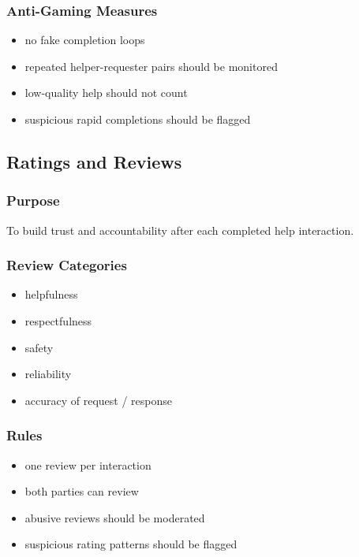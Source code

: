 \documentclass[11pt]{article}
\begin{document}
\subsubsection{Anti-Gaming Measures}
\begin{itemize}[leftmargin=1.5em]
    \item no fake completion loops
    \item repeated helper-requester pairs should be monitored
    \item low-quality help should not count
    \item suspicious rapid completions should be flagged
\end{itemize}

\subsection{Ratings and Reviews}

\subsubsection{Purpose}
To build trust and accountability after each completed help interaction.

\subsubsection{Review Categories}
\begin{itemize}[leftmargin=1.5em]
    \item helpfulness
    \item respectfulness
    \item safety
    \item reliability
    \item accuracy of request / response
\end{itemize}

\subsubsection{Rules}
\begin{itemize}[leftmargin=1.5em]
    \item one review per interaction
    \item both parties can review
    \item abusive reviews should be moderated
    \item suspicious rating patterns should be flagged
\end{itemize}
\end{document}
